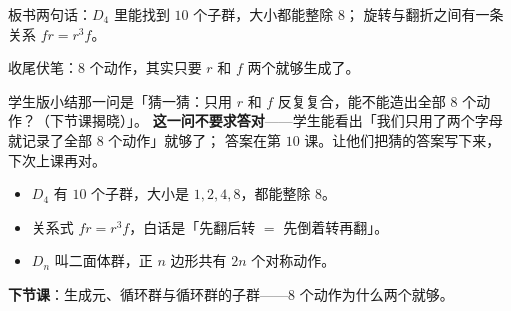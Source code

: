 板书两句话：\(D_4\) 里能找到 \(10\) 个子群，大小都能整除 \(8\)；
旋转与翻折之间有一条关系 \(fr=r^3f\)。

收尾伏笔：\(8\) 个动作，其实只要 \(r\) 和 \(f\) 两个就够生成了。

\begin{zhu}
  学生版小结那一问是「猜一猜：只用 \(r\) 和 \(f\) 反复复合，能不能造出全部 \(8\) 个动作？（下节课揭晓）」。
  \textbf{这一问不要求答对}——学生能看出「我们只用了两个字母就记录了全部 \(8\) 个动作」就够了；
  答案在第 \(10\) 课。让他们把猜的答案写下来，下次上课再对。
\end{zhu}

\begin{xiaojie}
  \begin{itemize}
    \item \(D_4\) 有 \(10\) 个子群，大小是 \(1,2,4,8\)，都能整除 \(8\)。
    \item 关系式 \(fr=r^3f\)，白话是「先翻后转 \(=\) 先倒着转再翻」。
    \item \(D_n\) 叫二面体群，正 \(n\) 边形共有 \(2n\) 个对称动作。
  \end{itemize}
\end{xiaojie}

\noindent\textbf{下节课}：生成元、循环群与循环群的子群——\(8\) 个动作为什么两个就够。